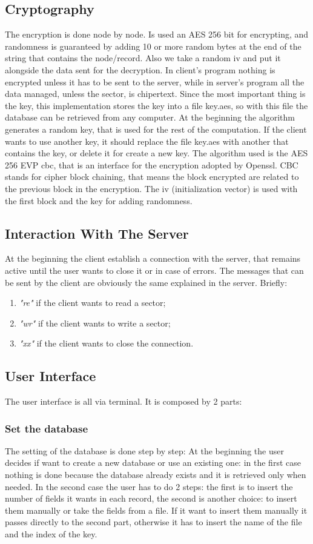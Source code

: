 \subsection{Cryptography}
The encryption is done node by node. Is used an AES 256 bit for encrypting, and randomness is guaranteed by adding 10 or more random bytes at the end of the string that contains the node/record. Also we take a random iv and put it alongside the data sent for the decryption.
In client's program nothing is encrypted unless it has to be sent to the server, while in server's program all the data managed, unless the sector, is chipertext.
Since the most important thing is the key, this implementation stores the key into a file key.aes, so with this file the database can be retrieved from any computer.
At the beginning the algorithm generates a random key, that is used for the rest of the computation. If the client wants to use another key, it should replace the file key.aes with another that contains the key, or delete it for create a new key.
The algorithm used is the AES 256 EVP cbc, that is an interface for the encryption adopted by Openssl. CBC stands for cipher block chaining, that means the block encrypted are related to the previous block in the encryption.
The iv (initialization vector) is used with the first block and the key for adding randomness.

\subsection{Interaction With The Server}
At the beginning the client establish a connection with the server, that remains active until the user wants to close it or in case of errors. 
The messages that can be sent by the client are obviously the same explained in the server. 
Briefly:
\begin{enumerate}
    \item \emph{"re"} if the client wants to read a sector;
    \item \emph{"wr"} if the client wants to write a sector;
    \item \emph{"xx"} if the client wants to close the connection.
\end{enumerate}

\subsection{User Interface}
The user interface is all via terminal. It is composed by 2 parts:
\subsubsection{Set the database}
The setting of the database is done step by step:
At the beginning the user decides if want to create a new database or use an existing one: in the first case nothing is done because the database already exists and it is retrieved only when needed. In the second case the user has to do 2 steps: the first is to insert the number of fields it wants in each record, the second is another choice: to insert them manually or take the fields from a file. If it want to insert them manually it passes directly to the second part, otherwise it has to insert the name of the file and the index of the key.
